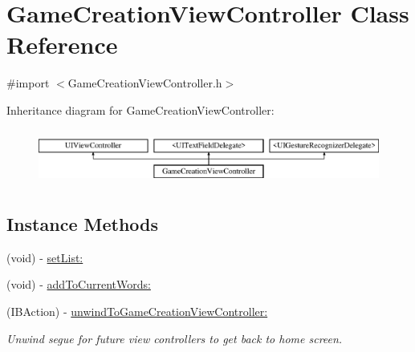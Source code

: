 \hypertarget{interface_game_creation_view_controller}{\section{Game\+Creation\+View\+Controller Class Reference}
\label{interface_game_creation_view_controller}
}


{\ttfamily \#import $<$Game\+Creation\+View\+Controller.\+h$>$}

Inheritance diagram for Game\+Creation\+View\+Controller\+:\begin{figure}[H]
\begin{center}
\leavevmode
\includegraphics[height=1.839080cm]{interface_game_creation_view_controller}
\end{center}
\end{figure}
\subsection*{Instance Methods}
\begin{DoxyCompactItemize}
\item 
(void) -\/ \hyperlink{interface_game_creation_view_controller_ac60a20e175e551de4eb69939f8c37183}{set\+List\+:}
\item 
(void) -\/ \hyperlink{interface_game_creation_view_controller_ab330431f8cb9b2eaa131678a676a4a2c}{add\+To\+Current\+Words\+:}
\item 
(I\+B\+Action) -\/ \hyperlink{interface_game_creation_view_controller_a09628866275bb5c782dc26f58208a660}{unwind\+To\+Game\+Creation\+View\+Controller\+:}
\begin{DoxyCompactList}\small\item\em Unwind segue for future view controllers to get back to home screen. \end{DoxyCompactList}\end{DoxyCompactItemize}
